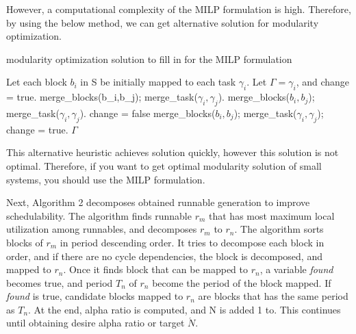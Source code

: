 \documentclass[conference,compsoc]{IEEEtran}
\begin{document}
 However, a computational complexity of the MILP formulation is high.
Therefore, by using the below method, we can get alternative solution for modularity optimization.   

\begin{algorithm}
\caption{modularity optimization solution to fill in for the MILP formulation}         
\label{alg1}                          
\begin{algorithmic}[1]
\STATE Let each block $b_i$ in S be initially mapped to each task $\gamma_i$.
\STATE Let $\Gamma = {\gamma_i}$, and change = true.
			\STATE merge\_blocks(b\_i,b\_j); merge\_task($\gamma_i,\gamma_j$).
		\ENDIF
	\ENDWHILE
			\STATE merge\_blocks($b_i,b_j$); merge\_task($\gamma_i,\gamma_j$).
		\ENDIF
	\ENDWHILE
	\STATE change = false
		\STATE merge\_blocks($b_i,b_j$); merge\_task($\gamma_i,\gamma_j$); change = true.
	\ENDIF
\ENDWHILE
\RETURN $\Gamma$
\end{algorithmic}
\end{algorithm}

 This alternative heuristic achieves solution quickly, however this solution is not optimal.
Therefore, if you want to get optimal modularity solution of small systems, you should use the MILP formulation.


Next, Algorithm 2 decomposes obtained runnable generation to improve schedulability.
The algorithm finds runnable $r_m$ that has most maximum local utilization among runnables, and decomposes $r_m$ to $r_n$.
The algorithm sorts blocks of $r_m$ in period descending order.
It tries to decompose each block in order, and if there are no cycle dependencies, the block is decomposed, and mapped to $r_n$.
Once it finds block that can be mapped to $r_n$, a variable {\it found} becomes true, and period $T_n$ of $r_n$ become the period of the block mapped.
If {\it found} is true, candidate blocks mapped to $r_n$ are blocks that has the same period as $T_n$.
At the end, alpha ratio is computed, and N is added 1 to.
This continues until obtaining desire alpha ratio or target $\acute{N}$.
\end{document}
